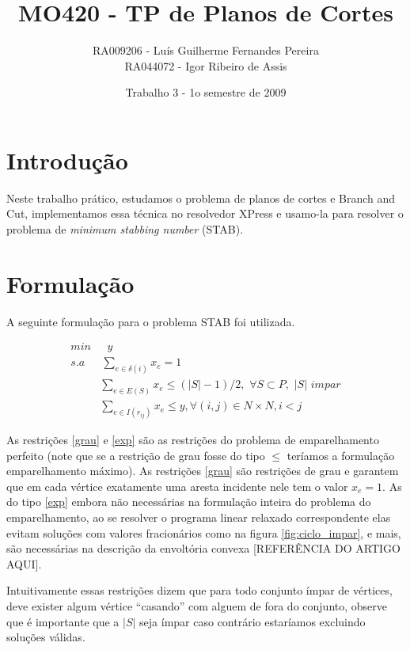 \documentclass[11pt]{article}
\title{MO420 - TP de Planos de Cortes}
\author{RA009206 - Luís Guilherme Fernandes Pereira \\
RA044072 - Igor Ribeiro de Assis}
\date{Trabalho 3 - 1o semestre de 2009}
\begin{document}
\maketitle

\section{Introdução}

Neste trabalho prático, estudamos o problema de planos de cortes e
Branch and Cut, implementamos essa técnica no resolvedor XPress e
usamo-la para resolver o problema de \emph{minimum stabbing number}
(STAB).

\section{Formulação}

A seguinte formulação para o problema STAB foi utilizada.

\begin{align}
  min & \hspace{8pt}y\\
  s.a & \hspace{2pt}\sum_{e \in \delta (i)}{x_e} = 1 \label{grau} \\
      & \sum_{e \in E(S)}{x_e} \le (|S|-1)/2, \hspace{4pt} \forall S
  \subset P, \hspace{4pt} |S|
  \hspace{4pt} impar \label{exp} \\
      & \sum_{e \in I(r_{ij})}{x_e} \le y, \forall (i,j) \in N \times N,
    i < j \label{inter}
\end{align}

As restrições \eqref{grau} e \eqref{exp} são as restrições do problema
de emparelhamento perfeito (note que se a restrição de grau fosse do
tipo $\le$ teríamos a formulação emparelhamento máximo). As restrições
\eqref{grau} são restrições de grau e garantem que em cada vértice
exatamente uma aresta incidente nele tem o valor $x_e = 1$. As do tipo
\eqref{exp} embora não necessárias na formulação inteira do problema
do emparelhamento, ao se resolver o programa linear relaxado
correspondente elas evitam soluções com valores fracionários como na
figura \ref{fig:ciclo_impar}, e mais, são necessárias na descrição da
envoltória convexa [REFERÊNCIA DO ARTIGO AQUI].

Intuitivamente essas restrições dizem que para todo conjunto ímpar de
vértices, deve exister algum vértice ``casando'' com alguem de fora do
conjunto, observe que é importante que a $|S|$ seja ímpar caso
contrário estaríamos excluindo soluções válidas.
\end{document}
